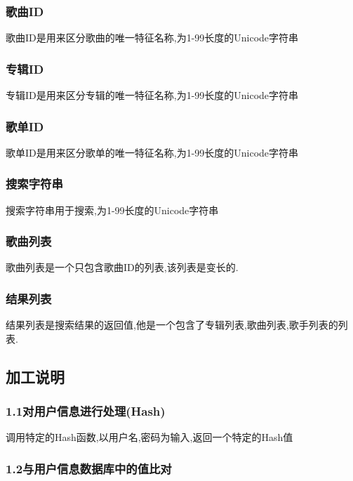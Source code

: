 \subsubsection{歌曲ID}

歌曲ID是用来区分歌曲的唯一特征名称,为1-99长度的Unicode字符串

\subsubsection{专辑ID}

专辑ID是用来区分专辑的唯一特征名称,为1-99长度的Unicode字符串

\subsubsection{歌单ID}

歌单ID是用来区分歌单的唯一特征名称,为1-99长度的Unicode字符串

\subsubsection{搜索字符串}

搜索字符串用于搜索,为1-99长度的Unicode字符串

\subsubsection{歌曲列表}

歌曲列表是一个只包含歌曲ID的列表,该列表是变长的.

\subsubsection{结果列表}

结果列表是搜索结果的返回值,他是一个包含了专辑列表,歌曲列表,歌手列表的列表.


\subsection{加工说明}

\subsubsection{1.1对用户信息进行处理(Hash)}

调用特定的Hash函数,以用户名,密码为输入,返回一个特定的Hash值

\subsubsection{1.2与用户信息数据库中的值比对}


